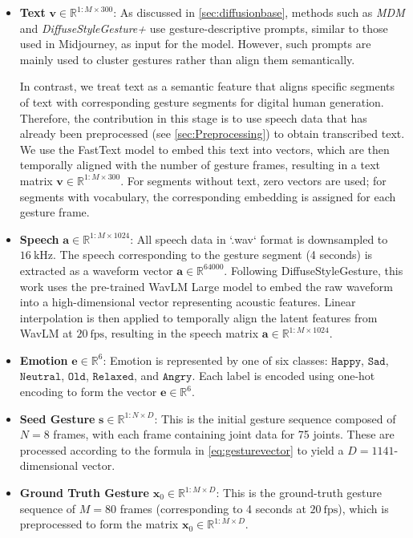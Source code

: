 \begin{itemize}
	\item \textbf{Text} $\mathbf{v} \in \mathbb{R}^{1:M \times 300}$:  
	As discussed in \autoref{sec:diffusionbase}, methods such as \textit{MDM} \citep{tevet2022human} and \textit{DiffuseStyleGesture+} \citep{yang2022DiffuseStyleGestureplus} use gesture-descriptive prompts, similar to those used in Midjourney, as input for the model. However, such prompts are mainly used to cluster gestures rather than align them semantically. 
	
	In contrast, we treat text as a semantic feature that aligns specific segments of text with corresponding gesture segments for digital human generation. Therefore, the contribution in this stage is to use speech data that has already been preprocessed (see \autoref{sec:Preprocessing}) to obtain transcribed text. We use the FastText model \citep{bojanowski2017enriching} to embed this text into vectors, which are then temporally aligned with the number of gesture frames, resulting in a text matrix $\mathbf{v} \in \mathbb{R}^{1:M \times 300}$. For segments without text, zero vectors are used; for segments with vocabulary, the corresponding embedding is assigned for each gesture frame.
	
	\item \textbf{Speech} $\mathbf{a} \in \mathbb{R}^{1:M \times 1024}$:  
	All speech data in `.wav` format is downsampled to $16~\mathrm{kHz}$. The speech corresponding to the gesture segment (4 seconds) is extracted as a waveform vector $\mathbf{a} \in \mathbb{R}^{64000}$. Following DiffuseStyleGesture, this work uses the pre-trained WavLM Large model \citep{Chen_2022} to embed the raw waveform into a high-dimensional vector representing acoustic features. Linear interpolation is then applied to temporally align the latent features from WavLM at $20~\text{fps}$, resulting in the speech matrix $\mathbf{a} \in \mathbb{R}^{1:M \times 1024}$.
	
	\item \textbf{Emotion} $\mathbf{e} \in \mathbb{R}^{6}$:  
	Emotion is represented by one of six classes: $\texttt{Happy}$, $\texttt{Sad}$, $\texttt{Neutral}$, $\texttt{Old}$, $\texttt{Relaxed}$, and $\texttt{Angry}$.  
	Each label is encoded using one-hot encoding to form the vector $\mathbf{e} \in \mathbb{R}^{6}$.
	
	\item \textbf{Seed Gesture} $\mathbf{s} \in \mathbb{R}^{1:N \times D}$:  
	This is the initial gesture sequence composed of $N=8$ frames, with each frame containing joint data for 75 joints. These are processed according to the formula in \autoref{eq:gesturevector} to yield a $D=1141$-dimensional vector.
	
	\item \textbf{Ground Truth Gesture} $\mathbf{x}_{0} \in \mathbb{R}^{1:M \times D}$:  
	This is the ground-truth gesture sequence of $M = 80$ frames (corresponding to 4 seconds at $20~\text{fps}$), which is preprocessed to form the matrix $\mathbf{x}_{0} \in \mathbb{R}^{1:M \times D}$.
\end{itemize}

